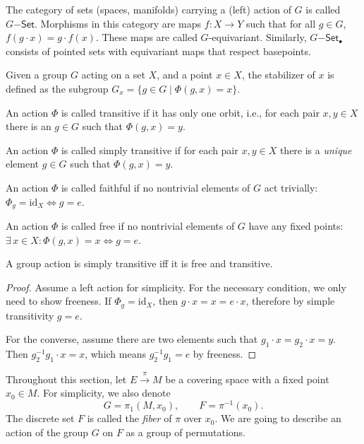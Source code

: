 \begin{defn}
    The category of sets (spaces, manifolds) carrying a (left) action of $G$ is called $G\mathsf{-Set}$. Morphisms in this category are maps $f:X\to Y$ such that for all $g\in G$, $f(g\cdot x)=g\cdot f(x)$. These maps are called $G$-equivariant. Similarly, $G\mathsf{-Set}_\bullet$ consists of pointed sets with equivariant maps that respect basepoints. 
\end{defn}
\begin{defn}[Stabilizer]
    Given a group $G$ acting on a set $X$, and a point $x\in X$, the stabilizer of $x$ is defined as the subgroup $G_x=\{g\in G\mid \Phi(g,x)=x\}$.
\end{defn}
\begin{defn}
    An action $\Phi$ is called transitive if it has only one orbit, i.e., for each pair $x,y\in X$ there is an $g\in G$ such that $\Phi(g,x)=y$.
\end{defn}
\begin{defn}
    An action $\Phi$ is called simply transitive if for each pair $x,y\in X$ there is a \emph{unique} element $g\in G$ such that $\Phi(g,x)=y$.
\end{defn}
\begin{defn}
    An action $\Phi$ is called faithful if no nontrivial elements of $G$ act trivially: $\Phi_g=\mathrm{id}_X \Leftrightarrow g=e$.
\end{defn}
\begin{defn}
    An action $\Phi$ is called free if no nontrivial elements of $G$ have any fixed points: $\exists\,x\in X: \Phi(g,x)=x\Leftrightarrow g=e$. 
\end{defn}
\begin{prop}
    A group action is simply transitive iff it is free and transitive.
\end{prop}
\begin{proof}
    Assume a left action for simplicity. For the necessary condition, we only need to show freeness. If $\Phi_g=\mathrm{id}_X$, then $g\cdot x=x=e\cdot x$, therefore by simple transitivity $g=e$.

    For the converse, assume there are two elements such that $g_1\cdot x=g_2\cdot x=y$. Then $g_2^{-1}g_1\cdot x=x$, which means $g_2^{-1}g_1=e$ by freeness.
\end{proof}

Throughout this section, let $E\overset{\pi}{\to}M$ be a covering space with a fixed point $x_0\in M$. For simplicity, we also denote
\[G=\pi_1(M,x_0),\quad \quad F=\pi^{-1}(x_0).\]
The discrete set $F$ is called the \emph{fiber} of $\pi$ over $x_0$. We are going to describe an action of the group $G$ on $F$ as a group of permutations. 

